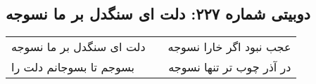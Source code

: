 \begin{center}
\section*{دوبیتی شماره ۲۲۷: دلت ای سنگدل بر ما نسوجه}
\label{sec:227}
\begin{longtable}{l p{0.5cm} r}
دلت ای سنگدل بر ما نسوجه
&&
عجب نبود اگر خارا نسوجه
\\
بسوجم تا بسوجانم دلت را
&&
در آذر چوب تر تنها نسوجه
\\
\end{longtable}
\end{center}
